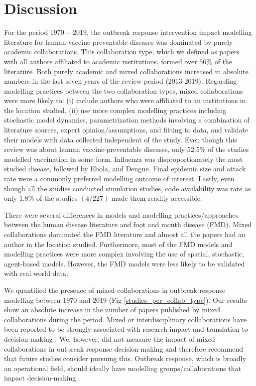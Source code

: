 \documentclass[10pt,letterpaper]{article}
\begin{document}
\section*{Discussion}
For the period $1970-2019$, the outbreak response intervention impact modelling literature for human vaccine-preventable diseases was dominated by purely academic collaborations. This collaboration type, which we defined as papers with all authors affiliated to academic institutions, formed over $56\%$ of the literature. Both purely academic and mixed collaborations increased in absolute numbers in the last seven years of the review period (2013-2019). Regarding modelling practices between the two collaboration types, mixed collaborations were more likely to: (i) include authors who were affiliated to an institutions in the location studied, (ii) use more complex modelling practices including stochastic model dynamics, parametrization methods involving a combination of literature sources, expert opinion/assumptions, and fitting to data, and validate their models with data collected independent of the study. Even though this review was about human vaccine-preventable diseases, only 52.5\% of the studies modelled vaccination in some form. Influenza was disproportionately the most studied disease, followed by Ebola, and Dengue. Final epidemic size and attack rate were a commonly preferred modelling outcome of interest. Lastly, even though all the studies conducted simulation studies, code availability was rare as only $1.8\%$ of the studies $(4/227)$ made them readily accessible.

There were several differences in models and modelling practices/approaches between the human disease literature and foot and mouth disease (FMD). Mixed collaborations dominated the FMD literature and almost all the papers had an author in the location studied. Furthermore, most of the FMD models and modelling practices were more complex involving the use of spatial, stochastic, agent-based models. However, the FMD models were less likely to be validated with real world data.

We quantified the presence of mixed collaborations in outbreak response modelling between $1970$ and $2019$ (Fig \ref{studies_per_collab_type}). Our results show an absolute increase in the number of papers published by mixed collaborations during the period. Mixed or interdisciplinary collaborations have been reported to be strongly associated with research impact and translation to decision-making \cite{Deelstra2003}. We, however, did not measure the impact of mixed collaborations in outbreak response decision-making and therefore recommend that future studies consider pursuing this. Outbreak response, which is broadly an operational field, should ideally have modelling groups/collaborations that impact decision-making. 
\end{document}
